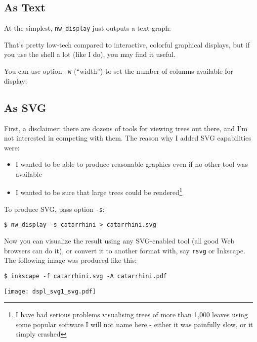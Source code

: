 \documentclass[a4paper,10pt]{report}
\newcommand{\svg}{\textsc{SVG}}
\newcommand{\display}{\texttt{nw\_display}}
\theoremstyle{definition}
\theoremstyle{definition}
\begin{document}
\subsection{As Text}
\label{sct_display_text}

At the simplest, \display{} just outputs a text graph:




That's pretty low-tech compared to interactive, colorful graphical displays, but if you use the shell a lot (like I do), you may find it useful.

You can use option \texttt{-w} (``width'') to set the number of columns available for display:




\subsection{As \svg}
\label{sct_display_svg}

First, a disclaimer: there are dozens of tools for viewing trees out there, and I'm not interested in competing with them. The reason why I added \svg{} capabilities were:
\begin{itemize}
 \item I wanted to be able to produce reasonable graphics even if no other tool was available
 \item I wanted to be sure that large trees could be rendered\footnote{I have had serious problems visualising trees of more than 1,000 leaves using some popular software I will not name here - either it was painfully slow, or it simply crashed} 
\end{itemize}

\noindent{}To produce \svg, pass option \texttt{-s}:
\begin{verbatim}
$ nw_display -s catarrhini > catarrhini.svg
\end{verbatim}

Now you can visualize the result using any \svg-enabled tool (all good Web browsers can do it), or convert it to another format with, say \texttt{rsvg} or Inkscape. The following image was produced like this:

\begin{verbatim}
$ inkscape -f catarrhini.svg -A catarrhini.pdf
\end{verbatim}

\begin{center}
 \texttt{[image: dspl\_svg1\_svg.pdf]}
\end{center}
\end{document}
